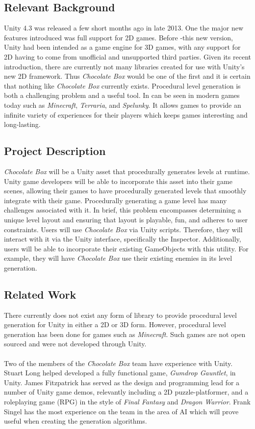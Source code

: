 \documentclass[pdftex,12pt,letter]{article}
\begin{document}
\subsection{Relevant Background}
Unity 4.3 was released a few short months ago in late 2013. One the major new features introduced was full support for 2D games. Before -this new version, Unity had been intended as a game engine for 3D games, with any support for 2D having to come from unofficial and unsupported third parties. Given its recent introduction, there are currently not many libraries created for use with Unity's new 2D framework. Thus \textit{Chocolate Box} would be one of the first and it is certain that nothing like \textit{Chocolate Box} currently exists. Procedural level generation is both a challenging problem and a useful tool. In can be seen in modern games today such as \textit{Minecraft}, \textit{Terraria}, and \textit{Spelunky}. It allows games to provide an infinite variety of experiences for their players which keeps games interesting and long-lasting.
\subsection{Project Description}
\textit{Chocolate Box} will be a Unity asset that procedurally generates levels at runtime. Unity game developers will be able to incorporate this asset into their game scenes, allowing their games to have procedurally generated levels that smoothly integrate with their game. Procedurally generating a game level has many challenges associated with it. In brief, this problem encompasses determining a unique level layout and ensuring that layout is playable, fun, and adheres to user constraints. Users will use \textit{Chocolate Box} via Unity scripts. Therefore, they will interact with it via the Unity interface, specifically the Inspector. Additionally, users will be able to incorporate their existing GameObjects with this utility. For example, they will have \textit{Chocolate Box} use their existing enemies in its level generation.
\subsection{Related Work}
There currently does not exist any form of library to provide procedural level generation for Unity in either a 2D or 3D form. However, procedural level generation has been done for games such as \textit{Minecraft}. Such games are not open sourced and were not developed through Unity. 
\\\\
Two of the members of the \textit{Chocolate Box} team have experience with Unity. Stuart Long helped developed a fully functional game, \textit{Gumdrop Gauntlet}, in Unity. James Fitzpatrick has served as the design and programming lead for a number of Unity game demos, relevantly including a 2D puzzle-platformer, and a roleplaying game (RPG) in the style of \textit{Final Fantasy} and \textit{Dragon Warrior}. Frank Singel has the most experience on the team in the area of AI which will prove useful when creating the generation algorithms.
\end{document}

